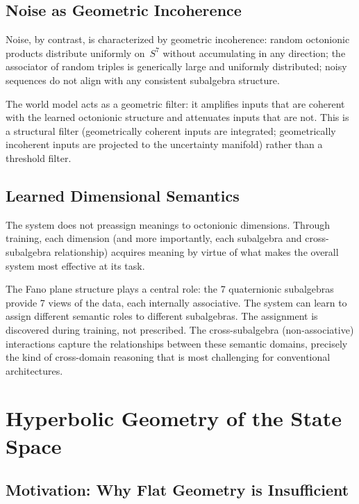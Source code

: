 \documentclass[11pt,a4paper]{article}
\begin{document}
\subsection{Noise as Geometric Incoherence}

Noise, by contrast, is characterized by geometric incoherence: random octonionic products distribute uniformly on~$S^7$ without accumulating in any direction; the associator of random triples is generically large and uniformly distributed; noisy sequences do not align with any consistent subalgebra structure.

The world model acts as a geometric filter: it amplifies inputs that are coherent with the learned octonionic structure and attenuates inputs that are not. This is a structural filter (geometrically coherent inputs are integrated; geometrically incoherent inputs are projected to the uncertainty manifold) rather than a threshold filter.

\subsection{Learned Dimensional Semantics}

The system does not preassign meanings to octonionic dimensions. Through training, each dimension (and more importantly, each subalgebra and cross-subalgebra relationship) acquires meaning by virtue of what makes the overall system most effective at its task.

The Fano plane structure plays a central role: the 7 quaternionic subalgebras provide 7 views of the data, each internally associative. The system can learn to assign different semantic roles to different subalgebras. The assignment is discovered during training, not prescribed. The cross-subalgebra (non-associative) interactions capture the relationships between these semantic domains, precisely the kind of cross-domain reasoning that is most challenging for conventional architectures.

\section{Hyperbolic Geometry of the State Space}
\label{sec:hyperbolic}

\subsection{Motivation: Why Flat Geometry is Insufficient}
\end{document}
